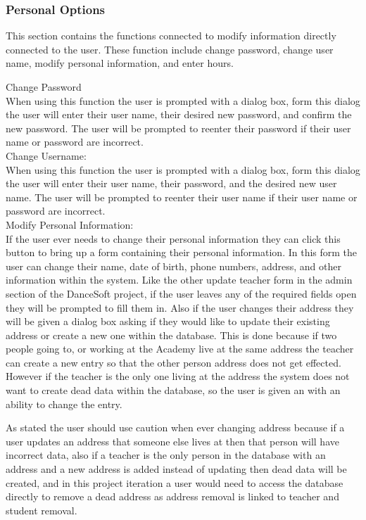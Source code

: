 \subsubsection{Personal Options}
This section contains the functions connected to modify information directly connected to the user. These function include change password, change user name, modify personal information, and enter hours.

Change Password\\
When using this function the user is prompted with a dialog box, form this dialog the user will enter their user name, their desired new password, and confirm the new password. The user will be prompted to reenter their password if their user name or password are incorrect.\\

Change Username:\\
When using this function the user is prompted with a dialog box, form this dialog the user will enter their user name, their password, and the desired new user name. The user will be prompted to reenter their user name if their user name or password are incorrect.\\

Modify Personal Information:\\
If the user ever needs to change their personal information they can click this button to bring up a form containing their personal information. In this form the user can change their name, date of birth, phone numbers, address, and other information within the system. Like the other update teacher form in the admin section of the DanceSoft project, if the user leaves any of the required fields open they will be prompted to fill them in. Also if the user changes their address they will be given a dialog box asking if they would like to update their existing address or create a new one within the database. This is done because if two people going to, or working at the Academy live at the same address the teacher can create a new entry so that the other person address does not get effected. However if the teacher is the only one living at the address the system does not want to create dead data within the database, so the user is given an with an ability to change the entry. 

As stated the user should use caution when ever changing address because if a user updates an address that someone else lives at then that person will have incorrect data, also if a teacher is the only person in the database with an address and a new address is added instead of updating then dead data will be created, and in this project iteration a user would need to access the database directly to remove a dead address as address removal is linked to teacher and student removal.

